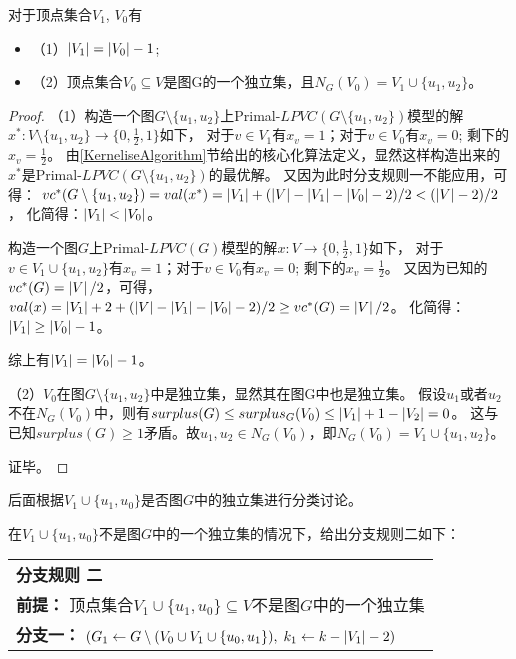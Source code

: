 \begin{claim}
对于顶点集合$V_1$, $V_0$有
\begin{itemize}
  \item{（1）}$\left\vert V_1 \right\vert = \left\vert V_0 \right\vert - 1$;
  \item{（2）}顶点集合$V_0 \subseteq V$是图G的一个独立集，且$N_G(V_0) = V_1 \cup \{u_1, u_2\}$。
\end{itemize}
\end{claim}
\begin{proof}
（1）构造一个图$G\setminus\{u_1, u_2\}$上Primal-$LPVC(G\setminus\{u_1, u_2\})$模型的解$x^* : V \setminus \{u_1, u_2\} \rightarrow \{0, \frac{1}{2}, 1\}$如下，
对于$v \in V_1$有$x_v = 1$；对于$v \in V_0$有$x_v = 0$; 剩下的$x_v = \frac{1}{2}$。
由\ref{KerneliseAlgorithm}节给出的核心化算法定义，显然这样构造出来的$x^*$是Primal-$LPVC(G\setminus\{u_1, u_2\})$的最优解。
又因为此时分支规则一不能应用，可得：
$vc^*(G\setminus\{u_1, u_2\}) = val(x^*) = \left\vert V_1 \right\vert + (\left\vert V \right\vert - \left\vert V_1 \right\vert - \left\vert V_0 \right\vert - 2) / 2 < (\left\vert V \right\vert - 2) / 2$，
化简得：$\left\vert V_1 \right\vert < \left\vert V_0 \right\vert$。

构造一个图$G$上Primal-$LPVC(G)$模型的解$x : V \rightarrow \{0, \frac{1}{2}, 1\}$如下，
对于$v \in V_1 \cup \{u_1, u_2\}$有$x_v = 1$；对于$v \in V_0$有$x_v = 0$; 剩下的$x_v = \frac{1}{2}$。
又因为已知的$vc^*(G) = \left\vert V \right\vert / 2$，可得，
$val(x) = \left\vert V_1 \right\vert + 2 + (\left\vert V \right\vert - \left\vert V_1 \right\vert - \left\vert V_0 \right\vert - 2) / 2 \ge vc^*(G) = \left\vert V \right\vert / 2$。
化简得：$\left\vert V_1 \right\vert \ge \left\vert V_0 \right\vert - 1$。 

综上有$\left\vert V_1 \right\vert = \left\vert V_0 \right\vert - 1$。

（2）$V_0$在图$G\setminus\{u_1, u_2\}$中是独立集，显然其在图G中也是独立集。
假设$u_1$或者$u_2$不在$N_G(V_0)$中，则有$surplus(G) \le surplus_G(V_0) \le \left\vert V_1 \right\vert + 1 - \left\vert V_2 \right\vert = 0$。
这与已知$surplus(G) \ge 1$矛盾。故$u_1,u_2 \in N_G(V_0)$，即$N_G(V_0) = V_1 \cup \{u_1, u_2\}$。

证毕。
\end{proof}

后面根据$V_1 \cup \{u_1, u_0\}$是否图$G$中的独立集进行分类讨论。

在$V_1 \cup \{u_1, u_0\}$不是图$G$中的一个独立集的情况下，给出分支规则二如下：\\

\begin{tabular}{ p{0.9\headwidth} }
  \hline
  \textbf{分支规则 二 }\\
  \textbf{前提：}  顶点集合$V_1 \cup \{u_1, u_0\}\subseteq V$不是图$G$中的一个独立集\\
  \textbf{分支一：} $(G_1 \leftarrow G \setminus (V_0 \cup V_1 \cup \{u_0, u_1\}),\; k_1 \leftarrow k - \left\vert V_1 \right\vert - 2)$\\
  \hline
\end{tabular} \vspace{0.5cm}

